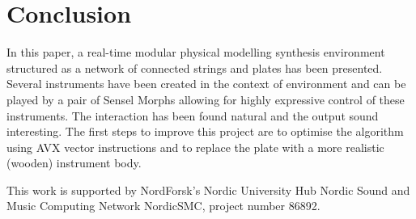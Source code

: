 \documentclass{article}
\begin{document}

\section{Conclusion}\label{sec:conclusion}

In this paper, a real-time modular physical modelling synthesis environment structured as a network of connected strings and plates has been presented. Several instruments have been created in the context of environment and can be played by a pair of Sensel Morphs allowing for highly expressive control of these instruments. The interaction has been found natural and the output sound interesting. The first steps to improve this project are to optimise the algorithm using AVX vector instructions and to replace the plate with a more realistic (wooden) instrument body.
 \begin{acknowledgments}
This work is supported by NordForsk's Nordic
University Hub Nordic Sound and Music Computing Network
NordicSMC, project number 86892.

 \end{acknowledgments} 

\begin{small}

\end{small}
\end{document}
